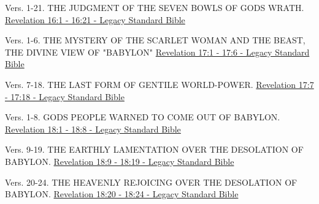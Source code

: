 \documentclass[
  ignorenonframetext,
]{beamer}
\begin{document}
\begin{frame}{16}
\label{section-269}
Vers. 1-21. THE JUDGMENT OF THE SEVEN BOWLS OF GOD\textquotesingle S
WRATH.\\
\href{https://read.lsbible.org/?q=rev16\%3A1-21}{Revelation 16:1 - 16:21
- Legacy Standard Bible}
\end{frame}

\begin{frame}{17}
\label{section-270}
\begin{block}{Vers. 1-6. THE MYSTERY OF THE SCARLET WOMAN AND THE BEAST,
THE DIVINE VIEW OF "BABYLON"}
\label{vers.-1-6.-the-mystery-of-the-scarlet-woman-and-the-beast-the-divine-view-of-babylon}
\href{https://read.lsbible.org/?q=rev17\%3A1-6}{Revelation 17:1 - 17:6 -
Legacy Standard Bible}
\end{block}

\begin{block}{Vers. 7-18. THE LAST FORM OF GENTILE WORLD-POWER.}
\label{vers.-7-18.-the-last-form-of-gentile-world-power.}
\href{https://read.lsbible.org/?q=rev17\%3A7-18}{Revelation 17:7 - 17:18
- Legacy Standard Bible}
\end{block}
\end{frame}

\begin{frame}{18}
\label{section-271}
\begin{block}{Vers. 1-8. GOD\textquotesingle S PEOPLE WARNED TO COME OUT
OF BABYLON.}
\label{vers.-1-8.-gods-people-warned-to-come-out-of-babylon.}
\href{https://read.lsbible.org/?q=rev18\%3A1-8}{Revelation 18:1 - 18:8 -
Legacy Standard Bible}
\end{block}

\begin{block}{Vers. 9-19. THE EARTHLY LAMENTATION OVER THE DESOLATION OF
BABYLON.}
\label{vers.-9-19.-the-earthly-lamentation-over-the-desolation-of-babylon.}
\href{https://read.lsbible.org/?q=rev18\%3A9-19}{Revelation 18:9 - 18:19
- Legacy Standard Bible}
\end{block}

\begin{block}{Vers. 20-24. THE HEAVENLY REJOICING OVER THE DESOLATION OF
BABYLON.}
\label{vers.-20-24.-the-heavenly-rejoicing-over-the-desolation-of-babylon.}
\href{https://read.lsbible.org/?q=rev18\%3A20-24}{Revelation 18:20 -
18:24 - Legacy Standard Bible}
\end{block}
\end{frame}
\end{document}
